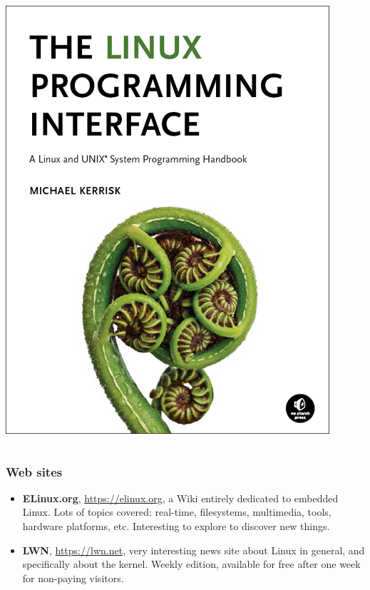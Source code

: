 \begin{frame}
\begin{columns}
    \vspace{0.5cm}
    \includegraphics[height=0.25\textheight]{slides/linux-references/linux-programming-interface.png}\\
  \end{columns}
\end{frame}

\begin{frame}
  \frametitle{Web sites}
  \begin{itemize}
  \item {\bf ELinux.org}, \url{https://elinux.org}, a Wiki entirely
    dedicated to embedded Linux. Lots of topics covered: real-time,
    filesystems, multimedia, tools, hardware platforms,
    etc. Interesting to explore to discover new things.
  \item {\bf LWN}, \url{https://lwn.net}, very interesting news site
    about Linux in general, and specifically about the kernel. Weekly
    edition, available for free after one week for non-paying
    visitors.
  \end{itemize}
\end{frame}

